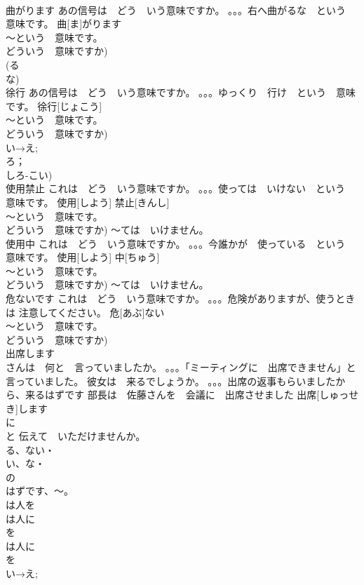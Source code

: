 \documentclass[8pt]{extreport}
\begin{document}
\begin{CJK}{UTF8}{min}
\\	曲がります	あの信号は　どう　いう意味ですか。 。。。右へ曲がるな　という　意味です。	曲[ま]がります			
\\	～という　意味です。
\\	どういう　意味ですか)	
\\	(る
\\	な)
\\	徐行	あの信号は　どう　いう意味ですか。 。。。ゆっくり　行け　という　意味です。	徐行[じょこう]			
\\	～という　意味です。
\\	どういう　意味ですか)	
\\	い→え;
\\	ろ；
\\	しろ-こい)
\\	使用禁止	これは　どう　いう意味ですか。 。。。使っては　いけない　という　意味です。	使用[しよう] 禁止[きんし]			
\\	～という　意味です。
\\	どういう　意味ですか) ～ては　いけません。
\\	使用中	これは　どう　いう意味ですか。 。。。今誰かが　使っている　という　意味です。	使用[しよう] 中[ちゅう]			
\\	～という　意味です。
\\	どういう　意味ですか) ～ては　いけません。
\\	危ないです	これは　どう　いう意味ですか。 。。。危険がありますが、使うときは 注意してください。	危[あぶ]ない			
\\	～という　意味です。
\\	どういう　意味ですか)	
\\	出席します	
\\	さんは　何と　言っていましたか。 。。。「ミーティングに　出席できません」と言っていました。 彼女は　来るでしょうか。 。。。出席の返事もらいましたから、来るはずです 部長は　佐藤さんを　会議に　出席させました	出席[しゅっせき]します			
\\	に
\\	と 伝えて　いただけませんか。
\\	る、ない・
\\	い、な・
\\	の
\\	はずです、～。
\\	は人を
\\	は人に
\\	を
\\	は人に
\\	を
\\	い→え;

\end{CJK}
\end{document}
